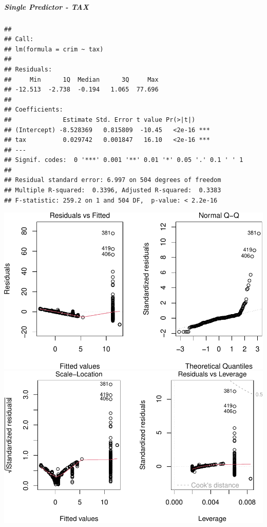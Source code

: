 \documentclass[
]{article}
\begin{document}
\hypertarget{single-predictor---tax}{%
\subparagraph{\texorpdfstring{\textbf{Single Predictor -
TAX}}{Single Predictor - TAX}}\label{single-predictor---tax}}

\begin{verbatim}
## 
## Call:
## lm(formula = crim ~ tax)
## 
## Residuals:
##     Min      1Q  Median      3Q     Max 
## -12.513  -2.738  -0.194   1.065  77.696 
## 
## Coefficients:
##              Estimate Std. Error t value Pr(>|t|)    
## (Intercept) -8.528369   0.815809  -10.45   <2e-16 ***
## tax          0.029742   0.001847   16.10   <2e-16 ***
## ---
## Signif. codes:  0 '***' 0.001 '**' 0.01 '*' 0.05 '.' 0.1 ' ' 1
## 
## Residual standard error: 6.997 on 504 degrees of freedom
## Multiple R-squared:  0.3396, Adjusted R-squared:  0.3383 
## F-statistic: 259.2 on 1 and 504 DF,  p-value: < 2.2e-16
\end{verbatim}

\includegraphics{Disha_Gandhi_Take_Home_Exam_PDF_files/figure-latex/unnamed-chunk-26-1.pdf}
\includegraphics{Disha_Gandhi_Take_Home_Exam_PDF_files/figure-latex/unnamed-chunk-26-2.pdf}
\end{document}

